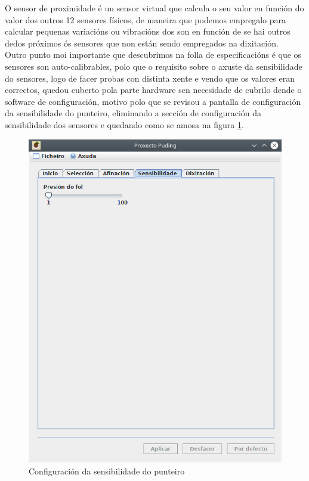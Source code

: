    O sensor de proximidade é un sensor virtual que calcula o seu valor en
   función do valor dos outros 12 sensores físicos, de maneira que podemos
   empregalo para calcular pequenas variacións ou vibracións dos son en función
   de se hai outros dedos próximos ós sensores que non están sendo empregados
   na dixitación. \\
   
   Outro punto moi importante que descubrimos na folla de especificacións é que
   os sensores son auto-calibrables, polo que o requisito sobre o axuste da
   sensibilidade do sensores, logo de facer probas con distinta xente e vendo
   que os valores eran correctos, quedou cuberto pola parte hardware sen
   necesidade de cubrilo dende o software de configuración, motivo polo que se
   revisou a pantalla de configuración da sensibilidade do punteiro, eliminando
   a sección de configuración da sensibilidade dos sensores e quedando como se
   amosa na figura \ref{figura:ConfiguracionSensibilidade}. \\
   
   \begin{figure}[htbp]
    \centering
    \includegraphics[scale=0.6, keepaspectratio=true]{./imagenes/configuracion-sensibilidade.png}
    \caption{Configuración da sensibilidade do punteiro}
    \label{figura:ConfiguracionSensibilidade}
   \end{figure}
   
